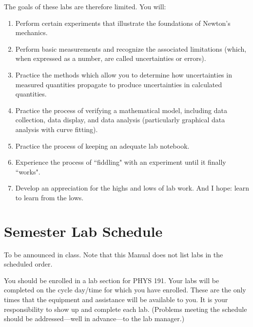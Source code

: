 The goals of these labs are therefore limited.  You will:
\begin{enumerate}
\item Perform certain experiments that illustrate the foundations of 
Newton's mechanics. 
\item Perform basic measurements and recognize the associated limitations
(which, when expressed as a number, are called uncertainties or errors).
\item Practice the methods which allow you to determine how uncertainties 
in measured quantities propagate to produce uncertainties 
in calculated quantities.
\item Practice the process of verifying a mathematical model,
including data collection, data display, and data analysis (particularly
graphical data analysis with curve fitting).
\item Practice the process of keeping an adequate lab notebook.
\item Experience the process of ``fiddling" with an experiment until it finally
``works".
\item Develop an appreciation for the highs and lows of lab work.
And I hope: learn to learn from the lows.
\end{enumerate}

\section*{Semester Lab Schedule}
To be announced in class.  Note that this Manual does not list
labs in the scheduled order.

You should be enrolled in a lab section for PHYS 191.  Your labs will
be completed on the cycle day/time for which you have enrolled.  These are
the only times that the equipment and assistance will be available to
you.  It is your responsibility to show up and complete each
lab.  (Problems meeting the schedule should be 
addressed---well in advance---to the lab manager.)

